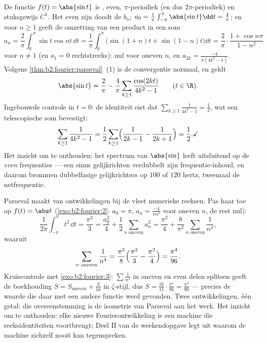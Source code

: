 \begin{example}\label{ex:b2:fourier:abssin}
De functie $f(t) = \abs{\sin t}$ is , even, $\pi$-periodiek
(en dus $2\pi$-periodiek) en stuksgewijs $C^1$. Het even zijn doodt
de $b_n$; $a_0 = \frac1\pi\int_{-\pi}^{\pi} \abs{\sin t}\dd t =
\frac4\pi$; en voor $n \geq 1$ geeft de omzetting van een product
in een som
\[
a_n = \frac2\pi\int_0^\pi \sin t\cos nt\,\dd t
= \frac{1}{\pi}\int_0^\pi\bigl(\sin(1+n)t +
\sin(1-n)t\bigr)\dd t
= \frac2\pi\cdot\frac{1 + \cos n\pi}{1 - n^2}
\]
voor $n \neq 1$ (en $a_1 = 0$ rechtstreeks): nul voor oneven $n$,
en $a_{2k} = \frac{-4}{\pi(4k^2-1)}$. Volgens
\cref{thm:b2:fourier:parseval}~(1) is de convergentie normaal, en
geldt
\[
\abs{\sin t} = \frac{2}{\pi} - \frac{4}{\pi}
\sum_{k\geq1}\frac{\cos(2kt)}{4k^2 - 1}
\qquad (t \in \R) .
\]
Ingebouwde controle in $t = 0$: de identiteit eist dat
$\sum_{k\geq1}\frac{1}{4k^2-1} = \frac12$, wat een telescopische
som bevestigt:
\[
\sum_{k\geq1}\frac{1}{4k^2-1}
= \frac12\sum_{k\geq1}\Bigl(\frac{1}{2k-1} -
\frac{1}{2k+1}\Bigr) = \frac12 . \checkmark
\]
Het inzicht om te onthouden: het spectrum van $\abs{\sin}$ leeft
uitsluitend op de \emph{even} frequenties --- een sinus
gelijkrichten verdubbelt zijn frequentie-inhoud, en daarom brommen
dubbelfasige gelijkrichters op $100$ of $120$ hertz, tweemaal de
netfrequentie.
\end{example}

\begin{example}\label{ex:b2:fourier:zetafourodd}
Parseval maakt van ontwikkelingen bij de vleet numerieke reeksen.
Pas haar toe op $f(t) = \abs t$ (\cref{exo:b2:fourier:2}: $a_0 =
\pi$, $a_n = \frac{-4}{\pi n^2}$ voor oneven $n$, de rest nul):
\[
\frac{1}{2\pi}\int_{-\pi}^{\pi}t^2\,\dd t = \frac{\pi^2}{3}
= \frac{a_0^2}{4} + \frac12\sum_{n \text{ oneven}} a_n^2
= \frac{\pi^2}{4} +
\frac{8}{\pi^2}\sum_{n\text{ oneven}}\frac{1}{n^4} ,
\]
waaruit
\[
\sum_{n\text{ oneven}}\frac{1}{n^4}
= \frac{\pi^2}{8}\Bigl(\frac{\pi^2}{3} -
\frac{\pi^2}{4}\Bigr) = \frac{\pi^4}{96} .
\]
Kruiscontrole met \cref{exo:b2:fourier:3}: $\sum\frac1{n^4}$ in
oneven en even delen splitsen geeft de boekhouding $S =
S_{\mathrm{oneven}} + \frac{S}{16}$ in $\zeta$-stijl, dus $S =
\frac{16}{15}\cdot\frac{\pi^4}{96} = \frac{\pi^4}{90}$ --- precies
de waarde die daar met een andere functie werd gevonden. Twee
ontwikkelingen, één getal: die overeenstemming is de isometrie van
Parseval aan het werk. Het inzicht om te onthouden: elke nieuwe
Fourierontwikkeling is een machine die reeksidentiteiten
voortbrengt; Deel II van de weekendopgave legt uit waarom de
machine zichzelf nooit kan tegenspreken.
\end{example}

